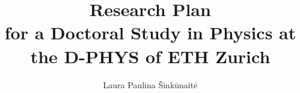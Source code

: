 \documentclass[12pt]{article}
\title{Research Plan\\
\vspace{1.8pt}
\large{for a Doctoral Study in Physics at the D-PHYS of ETH Zurich}}
\author
{Laura Paulina Šinkūnaitė}
\date{}
\newenvironment{sciabstract}{%
\begin{quote} \bf}
{\end{quote}}
\begin{document}
 

\begin{titlepage}

\mbox{}
\thispagestyle{empty}
\newpage
\end{titlepage}
\begin{titlepage}

\mbox{}
\thispagestyle{empty}
\newpage
\end{titlepage}
%


\baselineskip24pt


\maketitle 
\vspace{1.8pt}






\end{document}
